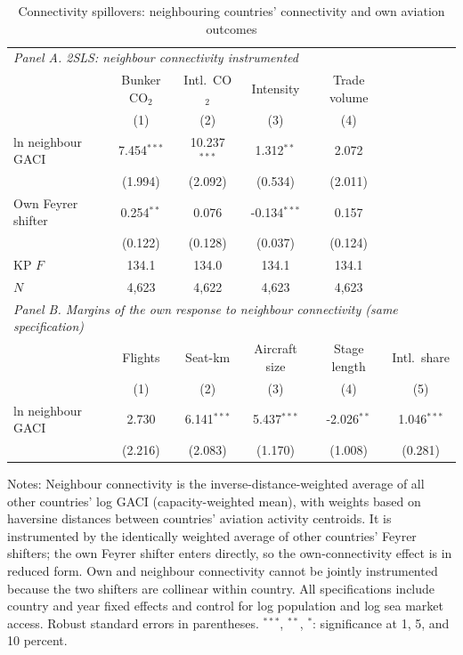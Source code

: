 \documentclass[11pt]{article}
\begin{document}
\begin{table}[htbp]
\centering
\begin{threeparttable}
\caption{Connectivity spillovers: neighbouring countries' connectivity and own aviation outcomes}
\label{tab:spillover}
\footnotesize
\begin{tabular}{lccccc}
\toprule
\multicolumn{6}{l}{\textit{Panel A. 2SLS: neighbour connectivity instrumented}} \\
 & \multicolumn{1}{c}{Bunker CO$_2$} & \multicolumn{1}{c}{Intl.\ CO$_2$} & \multicolumn{1}{c}{Intensity} & \multicolumn{1}{c}{Trade volume} & \\
 & (1) & (2) & (3) & (4) & \\
\midrule
  ln neighbour GACI & 7.454$^{***}$ & 10.237$^{***}$ & 1.312$^{**}$ & 2.072 & \\
   & (1.994) & (2.092) & (0.534) & (2.011) & \\
  Own Feyrer shifter & 0.254$^{**}$ & 0.076 & -0.134$^{***}$ & 0.157 & \\
   & (0.122) & (0.128) & (0.037) & (0.124) & \\
  KP $F$ & 134.1 & 134.0 & 134.1 & 134.1 & \\
  $N$ & 4,623 & 4,622 & 4,623 & 4,623 & \\
\midrule
\multicolumn{6}{l}{\textit{Panel B. Margins of the own response to neighbour connectivity (same specification)}} \\
 & \multicolumn{1}{c}{Flights} & \multicolumn{1}{c}{Seat-km} & \multicolumn{1}{c}{Aircraft size} & \multicolumn{1}{c}{Stage length} & \multicolumn{1}{c}{Intl.\ share} \\
 & (1) & (2) & (3) & (4) & (5) \\
\midrule
  ln neighbour GACI & 2.730 & 6.141$^{***}$ & 5.437$^{***}$ & -2.026$^{**}$ & 1.046$^{***}$ \\
   & (2.216) & (2.083) & (1.170) & (1.008) & (0.281) \\
\bottomrule
\end{tabular}
\begin{tablenotes}[flushleft]
\footnotesize
\item Notes: Neighbour connectivity is the inverse-distance-weighted average of all other countries' log GACI (capacity-weighted mean), with weights based on haversine distances between countries' aviation activity centroids. It is instrumented by the identically weighted average of other countries' Feyrer shifters; the own Feyrer shifter enters directly, so the own-connectivity effect is in reduced form. Own and neighbour connectivity cannot be jointly instrumented because the two shifters are collinear within country. All specifications include country and year fixed effects and control for log population and log sea market access. Robust standard errors in parentheses. $^{***}$, $^{**}$, $^{*}$: significance at 1, 5, and 10 percent.
\end{tablenotes}
\end{threeparttable}
\end{table}
\end{document}
